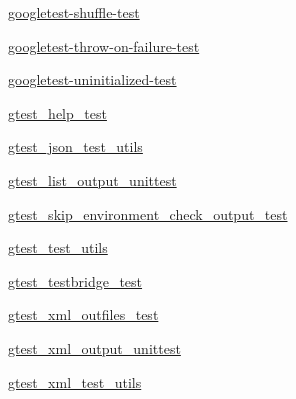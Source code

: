 \begin{DoxyCompactItemize}
\item 
 \mbox{\hyperlink{namespacegoogletest-master_1_1googletest_1_1test_1_1googletest-shuffle-test}{googletest-\/shuffle-\/test}}
\item 
 \mbox{\hyperlink{namespacegoogletest-master_1_1googletest_1_1test_1_1googletest-throw-on-failure-test}{googletest-\/throw-\/on-\/failure-\/test}}
\item 
 \mbox{\hyperlink{namespacegoogletest-master_1_1googletest_1_1test_1_1googletest-uninitialized-test}{googletest-\/uninitialized-\/test}}
\item 
 \mbox{\hyperlink{namespacegoogletest-master_1_1googletest_1_1test_1_1gtest__help__test}{gtest\+\_\+help\+\_\+test}}
\item 
 \mbox{\hyperlink{namespacegoogletest-master_1_1googletest_1_1test_1_1gtest__json__test__utils}{gtest\+\_\+json\+\_\+test\+\_\+utils}}
\item 
 \mbox{\hyperlink{namespacegoogletest-master_1_1googletest_1_1test_1_1gtest__list__output__unittest}{gtest\+\_\+list\+\_\+output\+\_\+unittest}}
\item 
 \mbox{\hyperlink{namespacegoogletest-master_1_1googletest_1_1test_1_1gtest__skip__environment__check__output__test}{gtest\+\_\+skip\+\_\+environment\+\_\+check\+\_\+output\+\_\+test}}
\item 
 \mbox{\hyperlink{namespacegoogletest-master_1_1googletest_1_1test_1_1gtest__test__utils}{gtest\+\_\+test\+\_\+utils}}
\item 
 \mbox{\hyperlink{namespacegoogletest-master_1_1googletest_1_1test_1_1gtest__testbridge__test}{gtest\+\_\+testbridge\+\_\+test}}
\item 
 \mbox{\hyperlink{namespacegoogletest-master_1_1googletest_1_1test_1_1gtest__xml__outfiles__test}{gtest\+\_\+xml\+\_\+outfiles\+\_\+test}}
\item 
 \mbox{\hyperlink{namespacegoogletest-master_1_1googletest_1_1test_1_1gtest__xml__output__unittest}{gtest\+\_\+xml\+\_\+output\+\_\+unittest}}
\item 
 \mbox{\hyperlink{namespacegoogletest-master_1_1googletest_1_1test_1_1gtest__xml__test__utils}{gtest\+\_\+xml\+\_\+test\+\_\+utils}}
\end{DoxyCompactItemize}

